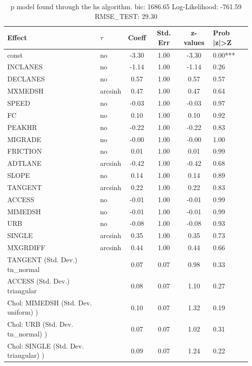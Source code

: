 \begin{table}
	\caption{p model found through the hs algorithm. bic: 1686.65 Log-Likelihood: -761.59 RMSE_TEST: 29.30}
	\begin{center}
		\begin{tabular}{|l|l|c|c|c|l|}
			\hline
			Effect & $\tau$ & Coeff & Std. Err & z-values & Prob |z|>Z \\
			\hline
			const & no & -3.30 & 1.00 & -3.30 & 0.00*** \\
			\hline
			INCLANES & no & -1.14 & 1.00 & -1.14 & 0.26 \\
			\hline
			DECLANES & no & 0.57 & 1.00 & 0.57 & 0.57 \\
			\hline
			MXMEDSH & arcsinh & 0.47 & 1.00 & 0.47 & 0.64 \\
			\hline
			SPEED & no & -0.03 & 1.00 & -0.03 & 0.97 \\
			\hline
			FC & no & 0.10 & 1.00 & 0.10 & 0.92 \\
			\hline
			PEAKHR & no & -0.22 & 1.00 & -0.22 & 0.83 \\
			\hline
			MIGRADE & no & -0.00 & 1.00 & -0.00 & 1.00 \\
			\hline
			FRICTION & no & 0.01 & 1.00 & 0.01 & 0.99 \\
			\hline
			ADTLANE & arcsinh & -0.42 & 1.00 & -0.42 & 0.68 \\
			\hline
			SLOPE & no & 0.14 & 1.00 & 0.14 & 0.89 \\
			\hline
			TANGENT & arcsinh & 0.22 & 1.00 & 0.22 & 0.83 \\
			\hline
			ACCESS & no & -0.01 & 1.00 & -0.01 & 0.99 \\
			\hline
			MIMEDSH & no & -0.01 & 1.00 & -0.01 & 0.99 \\
			\hline
			URB & no & -0.08 & 1.00 & -0.08 & 0.93 \\
			\hline
			SINGLE & arcsinh & 0.35 & 1.00 & 0.35 & 0.73 \\
			\hline
			MXGRDIFF & arcsinh & 0.44 & 1.00 & 0.44 & 0.66 \\
			\hline
			TANGENT (Std. Dev.) tn_normal &  & 0.07 & 0.07 & 0.98 & 0.33 \\
			\hline
			ACCESS (Std. Dev.) triangular &  & 0.08 & 0.07 & 1.10 & 0.27 \\
			\hline
			 Chol: MIMEDSH (Std. Dev. uniform) ) &  & 0.10 & 0.07 & 1.32 & 0.19 \\
			\hline
			 Chol: URB (Std. Dev. tn_normal) ) &  & 0.07 & 0.07 & 1.02 & 0.31 \\
			\hline
			 Chol: SINGLE (Std. Dev. triangular) ) &  & 0.09 & 0.07 & 1.24 & 0.22 \\

\end{tabular}
\end{center}
\end{table}
